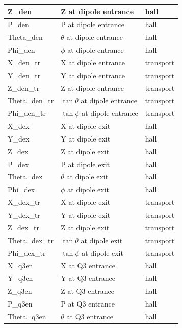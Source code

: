 \documentclass[11pt]{amsart}
\begin{document}
\begin{longtable}{| l | l | l |}
\hline
Z\_den              & Z at dipole entrance  & hall \\
\hline
P\_den              & P at dipole entrance  & hall \\
\hline
Theta\_den          & $\theta$ at dipole entrance  & hall \\
\hline
Phi\_den            & $\phi$ at dipole entrance  & hall \\
\hline
X\_den\_tr           & X at dipole entrance  & transport\\
\hline
Y\_den\_tr           & Y at dipole entrance  & transport\\
\hline
Z\_den\_tr           & Z at dipole entrance  & transport\\
\hline
Theta\_den\_tr       & $\tan{\theta}$ at dipole entrance  & transport\\
\hline
Phi\_den\_tr         & $\tan{\phi}$ at dipole entrance  & transport\\
\hline
\hline
X\_dex              & X at dipole exit  & hall \\
\hline
Y\_dex              & Y at dipole exit  & hall \\
\hline
Z\_dex              & Z at dipole exit  & hall \\
\hline
P\_dex              & P at dipole exit  & hall \\
\hline
Theta\_dex          & $\theta$ at dipole exit  & hall \\
\hline
Phi\_dex            & $\phi$ at dipole exit  & hall \\
\hline
X\_dex\_tr           & X at dipole exit  & transport\\
\hline
Y\_dex\_tr           & Y at dipole exit  & transport\\
\hline
Z\_dex\_tr           & Z at dipole exit  & transport\\
\hline
Theta\_dex\_tr       & $\tan{\theta}$ at dipole exit  & transport\\
\hline
Phi\_dex\_tr         & $\tan{\phi}$ at dipole exit  & transport\\
\hline
\hline
X\_q3en              & X at Q3 entrance  & hall \\
\hline
Y\_q3en              & Y at Q3 entrance  & hall \\
\hline
Z\_q3en              & Z at Q3 entrance  & hall \\
\hline
P\_q3en              & P at Q3 entrance  & hall \\
\hline
Theta\_q3en          & $\theta$ at Q3 entrance  & hall \\

\end{longtable}
\end{document}
